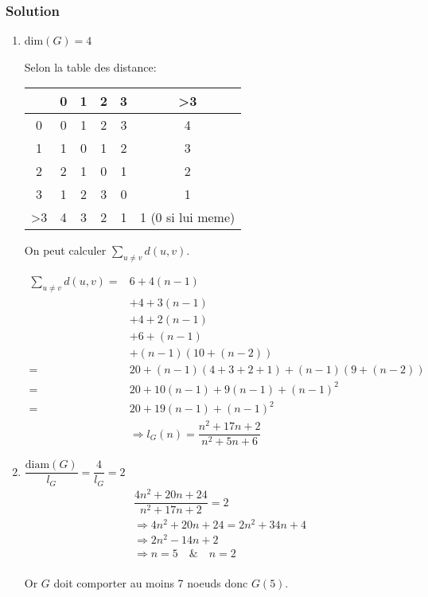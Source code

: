 \subsubsection*{Solution}
\begin{enumerate}

	\item dim$(G) = 4$

Selon la table des distance:

\begin{tabular}{c|ccccc}
    &0&1&2&3& >3 \\
    \hline
    0 & 0& 1& 2& 3& 4\\
    1 & 1& 0&1& 2& 3\\
    2 & 2& 1& 0& 1&2\\
    3 & 1& 2& 3& 0&1\\
    >3 & 4& 3& 2& 1& 1 (0 si lui meme)\\
\end{tabular}

On peut calculer $\sum_{u\neq v} d(u,v)$.

\begin{align*}
    \sum_{u\neq v} d(u,v) =& 6 + 4(n-1)\\
    &+ 4 + 3(n-1)\\
    &+4+2(n-1)\\
    &+6+(n-1)\\
    &+(n-1)(10 + (n-2))\\
    =& 20 + (n-1)(4+3+2+1) + (n-1)(9 + (n-2))\\
    =& 20 + 10(n-1) + 9(n-1) + (n-1)^2\\
    =& 20 + 19(n-1) + (n-1)^2\\
    & \Rightarrow l_G (n) = \dfrac{n^2 + 17n + 2}{n^2 + 5n + 6}
\end{align*}


	\item $\dfrac{\text{diam}(G)}{l_G} = \dfrac{4}{l_G} =2$
\begin{align*}
    & \dfrac{4n^2 + 20n + 24}{n^2 + 17n + 2} = 2\\
    & \Rightarrow 4n^2 + 20n + 24 = 2n^2 + 34n + 4\\
    & \Rightarrow 2n^2 - 14n + 2\\
    & \Rightarrow n = 5\hspace{1em}\&\hspace{1em} n = 2\\
\end{align*}

Or $G$ doit comporter au moins 7 noeuds donc $G(5)$.

\end{enumerate}

